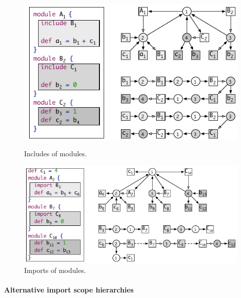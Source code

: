 \begin{figure}[t]
\begin{center}
  \includegraphics[trim=0.175cm 0cm 0cm 0cm]{figures/scope-graphs/imports/include}
  \caption{Includes of modules.}
  \bigskip
  \includegraphics[trim=0.175cm 0cm 0cm 0cm]{figures/scope-graphs/imports/imports}
  \caption{Imports of modules.}
\end{center}
\end{figure}

\paragraph{Alternative import scope hierarchies}

